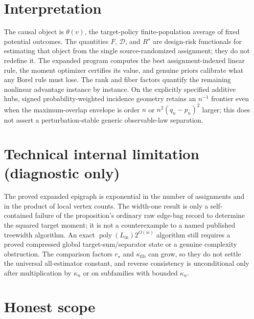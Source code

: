 \documentclass{article}
\begin{document}
\section{Interpretation}

The causal object is \(\theta(v)\), the target-policy finite-population average of fixed potential outcomes. The quantities \(F\), \(\mathcal D\), and \(R^{\star}\) are design-risk functionals for estimating that object from the single source-randomized assignment; they do not redefine it. The expanded program computes the best assignment-indexed linear rule, the moment optimizer certifies its value, and genuine priors calibrate what any Borel rule must lose. The rank and fiber factors quantify the remaining nonlinear advantage instance by instance. On the explicitly specified additive hubs, signed probability-weighted incidence geometry retains an \(n^{-1}\) frontier even when the maximum-overlap envelope is order \(n\) or \(n^2(q_n-p_n)^2\) larger; this does not assert a perturbation-stable generic observable-law separation.

\section*{Technical internal limitation (diagnostic only)}

The proved expanded epigraph is exponential in the number of assignments and in the product of local vertex counts. The width-one result is only a self-contained failure of the proposition's ordinary raw edge-bag record to determine the squared target moment; it is not a counterexample to a named published treewidth algorithm. An exact \(\operatorname{poly}(L_{\mathrm{in}})2^{O(w)}\) algorithm still requires a proved compressed global target-sum/separator state or a genuine complexity obstruction. The comparison factors \(r_{\star}\) and \(\kappa_{\mathrm{fib}}\) can grow, so they do not settle the universal all-estimator constant, and reverse consistency is unconditional only after multiplication by \(\kappa_n\) or on subfamilies with bounded \(\kappa_n\).

\section{Honest scope}
\end{document}
